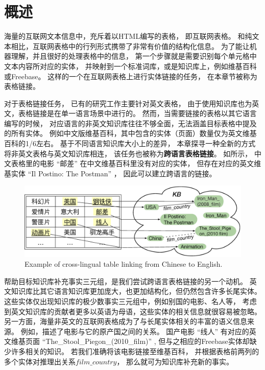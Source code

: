 
\section{概述}%
\label{sec:tabel-intro}


海量的互联网文本信息中，充斥着以HTML编写的表格，
即互联网表格\cite{cafarella2008webtables,wang2012understanding}。
和纯文本相比，互联网表格中的行列形式携带了非常有价值的结构化信息。
为了能让机器理解，并且很好的处理表格中的信息，%
第一个步骤就是需要识别每个单元格中文本内容所对应的实体，
并映射到一个标准词库，或是知识库上，例如维基百科或Freebase。
这样的一个在互联网表格上进行实体链接的任务，
在本章节被称为表格链接\cite{bhagavatula2015tabel,wu2016entity}。

对于表格链接任务，
已有的研究工作\cite{bhagavatula2015tabel,limaye2010annotating}主要针对英文表格，
由于使用知识库也为英文，表格链接是在单一语言场景中进行的。
然而，当需要链接的表格以其它语言编写的时候，
对应语言的非英文知识库往往不够全面，无法涵盖目标表格中提及的所有实体。
例如中文版维基百科，其中包含的实体（页面）数量仅为英文维基百科的1/6左右。
基于不同语言知识库大小上的差异，
本章探寻一种全新的方式将非英文表格与英文知识库相连，
该任务也被称为\textbf{跨语言表格链接}。
如所示，
中文表格里的电影 ``{邮差}'' 在中文维基百科里没有对应的实体，
但存在对应的英文维基实体 ``Il Postino: The Postman'' ，
因此可以建立跨语言的链接。

\begin{figure}[th]
\centering
\includegraphics[width=0.9\columnwidth]{figure/tabel/intro.eps}
{Example of cross-lingual table linking from Chinese to English.}
\label{fig:tabel-intro}
\end{figure}

帮助目标知识库补充事实三元组，是我们尝试跨语言表格链接的另一个动机。
英文知识库比其它语言知识库更加庞大，也更加结构化，但仍然包含许多长尾实体。
这些实体仅出现知识库的极少数事实三元组中，例如别国的电影、名人等，
考虑到英文知识库的贡献者更多以英语为母语，这些实体的相关信息就很容易被忽略。
另一方面，海量非英文的互联网表格成为了与长尾实体相关的丰富的语义信息来源。
例如，描述了电影与它的原产国之间的关系。
国产电影 ``{线人}'' 有对应的英文维基页面 ``The\_Stool\_Piegon\_(2010\_film)'' ,
但与之相应的Freebase实体却缺少许多相关的知识。
若我们准确将该电影链接至维基百科，
并根据表格前两列的多个实体对推理出关系$film\_country$，
那么就可为知识库补充新的事实。

